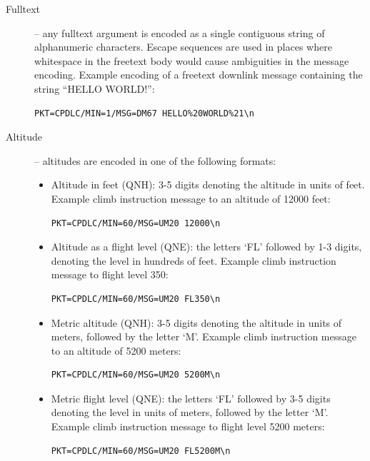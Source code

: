 \documentclass[a4paper,12pt]{article}
\begin{document}
\begin{description}

\item[Fulltext] -- any fulltext argument is encoded as a single
contiguous string of alphanumeric characters. Escape sequences are used
in places where whitespace in the freetext body would cause ambiguities
in the message encoding. Example encoding of a freetext downlink message
containing the string ``HELLO WORLD!'':

\begin{verbatim}
PKT=CPDLC/MIN=1/MSG=DM67 HELLO%20WORLD%21\n
\end{verbatim}

\item[Altitude] -- altitudes are encoded in one of the following formats:

\begin{itemize}

\item Altitude in feet (QNH): 3-5 digits denoting the altitude in
units of feet. Example climb instruction message to an altitude of 12000
feet:

\begin{verbatim}
PKT=CPDLC/MIN=60/MSG=UM20 12000\n
\end{verbatim}

\item Altitude as a flight level (QNE): the letters `FL' followed by 1-3
digits, denoting the level in hundreds of feet. Example climb instruction
message to flight level 350:

\begin{verbatim}
PKT=CPDLC/MIN=60/MSG=UM20 FL350\n
\end{verbatim}

\item Metric altitude (QNH): 3-5 digits denoting the altitude in units
of meters, followed by the letter `M'. Example climb instruction message
to an altitude of 5200 meters:

\begin{verbatim}
PKT=CPDLC/MIN=60/MSG=UM20 5200M\n
\end{verbatim}

\item Metric flight level (QNE): the letters `FL' followed by 3-5 digits
denoting the level in units of meters, followed by the letter `M'.
Example climb instruction message to flight level 5200 meters:

\begin{verbatim}
PKT=CPDLC/MIN=60/MSG=UM20 FL5200M\n
\end{verbatim}


\end{itemize}
\end{description}
\end{document}
